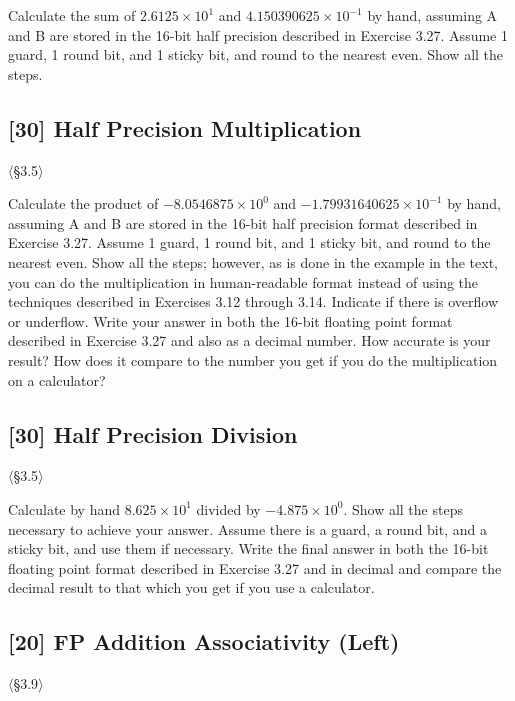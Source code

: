 \noindent Calculate the sum of $2.6125 \times 10^{1}$ and
$4.150390625 \times 10^{-1}$ by hand, assuming A and B are stored in the
16-bit half precision described in Exercise 3.27. Assume 1 guard, 1 round
bit, and 1 sticky bit, and round to the nearest even. Show all the steps.

\problembreak

\subsection{[30] Half Precision Multiplication}
\hypertarget{prob-3.30}{}
\noindent$\langle$\S3.5$\rangle$\medskip

\noindent Calculate the product of $-8.0546875 \times 10^{0}$ and
$-1.79931640625 \times 10^{-1}$ by hand, assuming A and B are stored in the
16-bit half precision format described in Exercise 3.27. Assume 1 guard, 1
round bit, and 1 sticky bit, and round to the nearest even. Show all the
steps; however, as is done in the example in the text, you can do the
multiplication in human-readable format instead of using the techniques
described in Exercises 3.12 through 3.14. Indicate if there is overflow or
underflow. Write your answer in both the 16-bit floating point format
described in Exercise 3.27 and also as a decimal number. How accurate is your
result? How does it compare to the number you get if you do the
multiplication on a calculator?

\problembreak

\subsection{[30] Half Precision Division}
\hypertarget{prob-3.31}{}
\noindent$\langle$\S3.5$\rangle$\medskip

\noindent Calculate by hand $8.625 \times 10^{1}$ divided by
$-4.875 \times 10^{0}$. Show all the steps necessary to achieve your answer.
Assume there is a guard, a round bit, and a sticky bit, and use them if
necessary. Write the final answer in both the 16-bit floating point format
described in Exercise 3.27 and in decimal and compare the decimal result to
that which you get if you use a calculator.

\problembreak

\subsection{[20] FP Addition Associativity (Left)}
\hypertarget{prob-3.32}{}
\noindent$\langle$\S3.9$\rangle$\medskip

